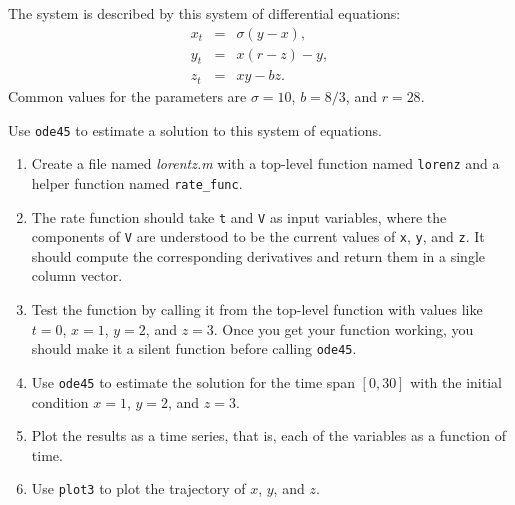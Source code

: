 The system is described by this system of differential equations:
%
\begin{eqnarray*}
x_t &=& \sigma (y - x),  \\
y_t &=& x (r - z) - y  , \\
z_t &=& xy - b z.
\end{eqnarray*}
%
Common values for the parameters are $\sigma = 10$, $b = 8/3$, and $r=28$.

Use \lstinline{ode45} to estimate a solution to this system of equations.


\begin{enumerate}

\item Create a file named {\em lorentz.m} with a top-level function named \lstinline{lorenz} and a helper function named \lstinline{rate_func}.

\item  The rate function should
take \lstinline{t} and \lstinline{V} as input variables, where the components
of \lstinline{V} are understood to be the current values of \lstinline{x},
\lstinline{y}, and \lstinline{z}.  It should compute the corresponding derivatives
and return them in a single column vector.

\item Test the function by calling it from the top-level function with values like $t=0$, $x=1$, $y=2$, and $z=3$.  
Once you get your function working, you should make it a silent function before calling \lstinline{ode45}.

\item Use \lstinline{ode45} to estimate the solution for the time span $[0, 30]$
with the initial condition $x=1$, $y=2$, and $z=3$.

\item Plot the results as a time series, that is, each of the variables as a function of time.

\item Use \lstinline{plot3} to plot the trajectory of $x$, $y$, and $z$.

\end{enumerate}



